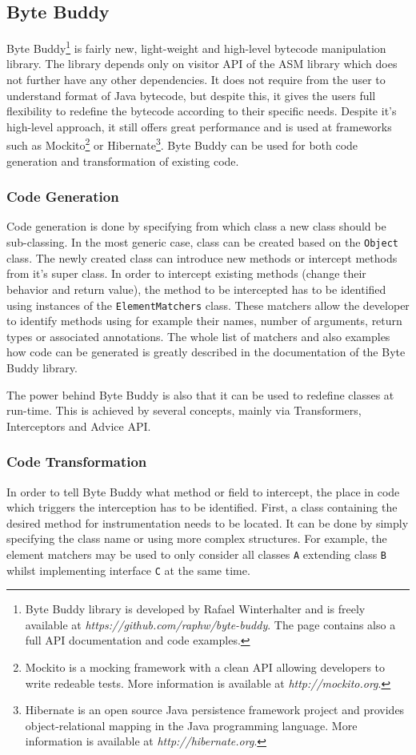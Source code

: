 \subsection{Byte Buddy}
\label{sec:byte_buddy}
Byte Buddy\footnote{Byte Buddy library is developed by Rafael Winterhalter and is freely available at \textit{https://github.com/raphw/byte-buddy}. The page contains also a full API documentation and code examples.} is fairly new, light-weight and high-level bytecode manipulation library. The library depends only on visitor API of the ASM library which does not further have any other dependencies. It does not require from the user to understand format of Java bytecode, but despite this, it gives the users full flexibility to redefine the bytecode according to their specific needs. Despite it's high-level approach, it still offers great performance \cite{ByteBuddy_Perf} and is used at frameworks such as Mockito\footnote{Mockito is a mocking framework with a clean API allowing developers to write redeable tests. More information is available at \textit{http://mockito.org}.} or Hibernate\footnote{Hibernate is an open source Java persistence framework project and provides object-relational mapping in the Java programming language. More information is available at \textit{http://hibernate.org}.}. Byte Buddy can be used for both code generation and transformation of existing code.

\subsubsection{Code Generation}
Code generation is done by specifying from which class a new class should be sub-classing. In the most generic case, class can be created based on the \texttt{Object} class. The newly created class can introduce new methods or intercept methods from it's super class. In order to intercept existing methods (change their behavior and return value), the method to be intercepted has to be identified using instances of the \texttt{ElementMatchers} class. These matchers allow the developer to identify methods using for example their names, number of arguments, return types or associated annotations. The whole list of matchers and also examples how code can be generated is greatly described in the documentation of the Byte Buddy library.

The power behind Byte Buddy is also that it can be used to redefine classes at run-time. This is achieved by several concepts, mainly via Transformers, Interceptors and Advice API.
\subsubsection{Code Transformation}
In order to tell Byte Buddy what method or field to intercept, the place in code which triggers the interception has to be identified. First, a class containing the desired method for instrumentation needs to be located. It can be done by simply specifying the class name or using more complex structures. For example, the element matchers may be used to only consider all classes \texttt{A} extending class \texttt{B} whilst implementing interface \texttt{C} at the same time. 

